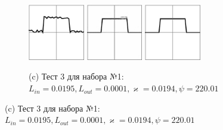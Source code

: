 \documentclass[12pt, a4paper]{article}
\renewcommand{\kappa}{\varkappa}
\begin{document}
\begin{figure}[!hp]
	\vspace{1em}
	\begin{subfigure}{\textwidth}
		\centering
		\includegraphics[width=0.27\textwidth]{res_n1_5}
		\hfill
		\includegraphics[width=0.27\textwidth]{res_n1_6}
		\hfill
		\includegraphics[width=0.27\textwidth]{3}
		\caption*{\small (c) Тест 3 для набора №1: $L_{in} = 0.0195,
		 L_{out} = 0.0001,
		  \kappa = 0.0194,
		   \psi = 220.01$}
	\end{subfigure}
\end{figure}

\newpage
\end{document}
